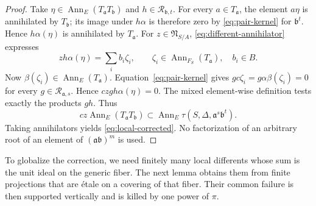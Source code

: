 \documentclass[11pt,reqno]{amsart}
\theoremstyle{definition}
\theoremstyle{remark}
\numberwithin{equation}{section}
\begin{document}
\begin{proof}
Take $\eta\in\operatorname{Ann}_E(T_{\mathfrak a}T_{\mathfrak b})$
and $h\in\mathcal R_{\mathfrak b,t}$. For every $a\in T_{\mathfrak a}$,
the element $a\eta$ is annihilated by $T_{\mathfrak b}$; its image
under $h\alpha$ is therefore zero by \eqref{eq:pair-kernel} for
$\mathfrak b^t$. Hence $h\alpha(\eta)$ is annihilated by
$T_{\mathfrak a}$.
For $z\in\mathfrak N_{S/A}$, \eqref{eq:different-annihilator} expresses
\[
 zh\alpha(\eta)=\sum_i b_i\zeta_i,
 \qquad \zeta_i\in\operatorname{Ann}_{F_S}(T_{\mathfrak a}),\quad b_i\in B.
\]
Now $\beta(\zeta_i)\in\operatorname{Ann}_E(T_{\mathfrak a})$.
Equation~\eqref{eq:pair-kernel} gives
$gc\zeta_i=g\alpha\beta(\zeta_i)=0$ for every
$g\in\mathcal R_{\mathfrak a,s}$. Hence $czgh\alpha(\eta)=0$.
The mixed element-wise definition tests exactly the products $gh$.
Thus
\[
 cz\operatorname{Ann}_E(T_{\mathfrak a}T_{\mathfrak b})
 \subset\operatorname{Ann}_E
       \tau(S,\Delta,\mathfrak a^s\mathfrak b^t).
\]
Taking annihilators yields \eqref{eq:local-corrected}. No factorization
of an arbitrary root of an element of $(\mathfrak a\mathfrak b)^m$
is used.
\end{proof}

To globalize the correction, we need finitely many local differents
whose sum is the unit ideal on the generic fiber. The next lemma
obtains them from finite projections that are \'etale on a covering
of that fiber. Their common failure is then supported vertically and
is killed by one power of $\pi$.
\end{document}
